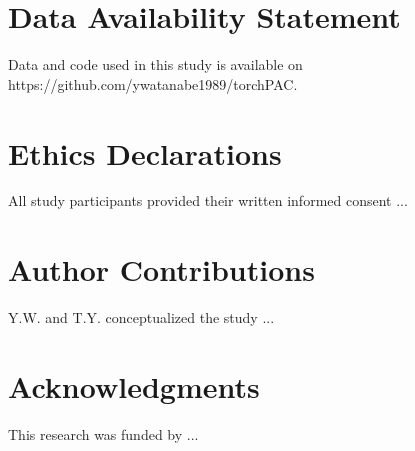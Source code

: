 \documentclass[preprint,review,12pt]{elsarticle}%
\begin{document}
\section*{Data Availability Statement}
Data and code used in this study is available on https://github.com/ywatanabe1989/torchPAC.

\label{data and code availability}







% 

% 




\section*{Ethics Declarations}
All study participants provided their written informed consent ...
\label{ethics declarations}

\section*{Author Contributions}
Y.W. and T.Y. conceptualized the study ...
\label{author contributions}

\section*{Acknowledgments}
This research was funded by ...
\label{acknowledgments}
\end{document}
